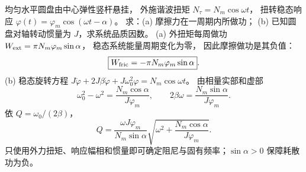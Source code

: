 均匀水平圆盘由中心弹性竖杆悬挂，
外施谐波扭矩 $N_\tau=N_m\cos\omega t$，
扭转稳态响应
$\varphi(t)=\varphi_m\cos(\omega t-\alpha)$。
求：(a) 摩擦力在一周期内所做功；
(b) 已知圆盘对轴转动惯量为 $J$，求系统品质因数。
\exsolution
(a) 外扭矩每周做功
$W_{\rm ext}=\pi N_m\varphi_m\sin\alpha$，
稳态系统能量周期变化为零，
因此摩擦做功是其负值：
\[
\boxed{W_{\rm fric}=-\pi N_m\varphi_m\sin\alpha}.
\]
(b) 稳态旋转方程
$J\ddot\varphi+2J\beta\dot\varphi+
J\omega_0^2\varphi=N_m\cos\omega t$。
由相量实部和虚部
\[
\omega_0^2-\omega^2
=\frac{N_m\cos\alpha}{J\varphi_m},
\qquad
2\beta\omega=\frac{N_m\sin\alpha}{J\varphi_m}.
\]
依 $Q=\omega_0/(2\beta)$，
\[
\boxed{Q=\frac{\omega J\varphi_m}{N_m\sin\alpha}
\sqrt{\omega^2+\frac{N_m\cos\alpha}{J\varphi_m}}}.
\]
\excheck 只使用外力扭矩、响应幅相和惯量即可确定阻尼与固有频率；$\sin\alpha>0$ 保障耗散功为负。
